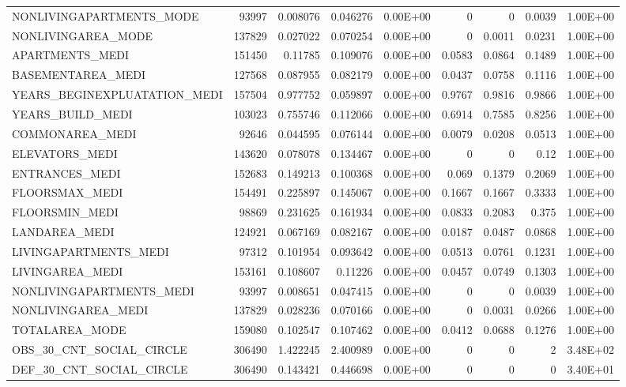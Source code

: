 \documentclass[12pt, letterpaper]{article}
\begin{document}
\begin{appendices}
{\begin{longtable}[c]{| l || r | r | r | r | r | r | r | r |}
 NONLIVINGAPARTMENTS_MODE	&	93997	&	0.008076	&	0.046276	&	0.00E+00	&	0	&	0	&	0.0039	&	1.00E+00	\\
 NONLIVINGAREA_MODE	&	137829	&	0.027022	&	0.070254	&	0.00E+00	&	0	&	0.0011	&	0.0231	&	1.00E+00	\\
 APARTMENTS_MEDI	&	151450	&	0.11785	&	0.109076	&	0.00E+00	&	0.0583	&	0.0864	&	0.1489	&	1.00E+00	\\
 BASEMENTAREA_MEDI	&	127568	&	0.087955	&	0.082179	&	0.00E+00	&	0.0437	&	0.0758	&	0.1116	&	1.00E+00	\\
 YEARS_BEGINEXPLUATATION_MEDI	&	157504	&	0.977752	&	0.059897	&	0.00E+00	&	0.9767	&	0.9816	&	0.9866	&	1.00E+00	\\
 YEARS_BUILD_MEDI	&	103023	&	0.755746	&	0.112066	&	0.00E+00	&	0.6914	&	0.7585	&	0.8256	&	1.00E+00	\\
 COMMONAREA_MEDI	&	92646	&	0.044595	&	0.076144	&	0.00E+00	&	0.0079	&	0.0208	&	0.0513	&	1.00E+00	\\
 ELEVATORS_MEDI	&	143620	&	0.078078	&	0.134467	&	0.00E+00	&	0	&	0	&	0.12	&	1.00E+00	\\
 ENTRANCES_MEDI	&	152683	&	0.149213	&	0.100368	&	0.00E+00	&	0.069	&	0.1379	&	0.2069	&	1.00E+00	\\
 FLOORSMAX_MEDI	&	154491	&	0.225897	&	0.145067	&	0.00E+00	&	0.1667	&	0.1667	&	0.3333	&	1.00E+00	\\
 FLOORSMIN_MEDI	&	98869	&	0.231625	&	0.161934	&	0.00E+00	&	0.0833	&	0.2083	&	0.375	&	1.00E+00	\\
 LANDAREA_MEDI	&	124921	&	0.067169	&	0.082167	&	0.00E+00	&	0.0187	&	0.0487	&	0.0868	&	1.00E+00	\\
 LIVINGAPARTMENTS_MEDI	&	97312	&	0.101954	&	0.093642	&	0.00E+00	&	0.0513	&	0.0761	&	0.1231	&	1.00E+00	\\
 LIVINGAREA_MEDI	&	153161	&	0.108607	&	0.11226	&	0.00E+00	&	0.0457	&	0.0749	&	0.1303	&	1.00E+00	\\
 NONLIVINGAPARTMENTS_MEDI	&	93997	&	0.008651	&	0.047415	&	0.00E+00	&	0	&	0	&	0.0039	&	1.00E+00	\\
 NONLIVINGAREA_MEDI	&	137829	&	0.028236	&	0.070166	&	0.00E+00	&	0	&	0.0031	&	0.0266	&	1.00E+00	\\
 TOTALAREA_MODE	&	159080	&	0.102547	&	0.107462	&	0.00E+00	&	0.0412	&	0.0688	&	0.1276	&	1.00E+00	\\
 OBS_30_CNT_SOCIAL_CIRCLE	&	306490	&	1.422245	&	2.400989	&	0.00E+00	&	0	&	0	&	2	&	3.48E+02	\\
 DEF_30_CNT_SOCIAL_CIRCLE	&	306490	&	0.143421	&	0.446698	&	0.00E+00	&	0	&	0	&	0	&	3.40E+01	\\

\end{longtable}}
\end{appendices}
\end{document}

